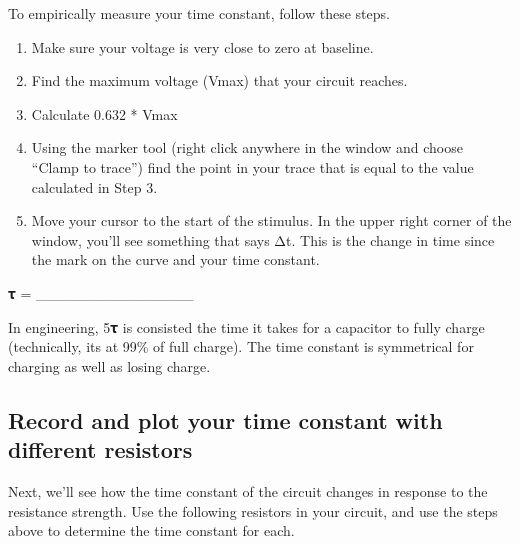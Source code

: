 \documentclass[letterpaper,10pt,english]{jupyterBook}
\begin{document}
\sphinxAtStartPar
To empirically measure your time constant, follow these steps.
\begin{enumerate}
%
\item {} 
\sphinxAtStartPar
Make sure your voltage is very close to zero at baseline.

\item {} 
\sphinxAtStartPar
Find the maximum voltage (Vmax) that your circuit reaches.

\item {} 
\sphinxAtStartPar
Calculate 0.632 * Vmax

\item {} 
\sphinxAtStartPar
Using the marker tool (right click anywhere in the window and choose “Clamp to trace”) find the point in your trace that is equal to the value calculated in Step 3.

\item {} 
\sphinxAtStartPar
Move your cursor to the start of the stimulus. In the upper right corner of the window, you’ll see something that says Δt. This is the change in time since the mark on the curve and your time constant.

\end{enumerate}

\sphinxAtStartPar
{}

\sphinxAtStartPar
𝛕 = \_\_\_\_\_\_\_\_\_\_\_\_\_\_\_

\sphinxAtStartPar
{}

\sphinxAtStartPar
In engineering, 5𝛕 is consisted the time it takes for a capacitor to fully charge (technically, its at 99\% of full charge). The time constant is symmetrical for charging as well as losing charge. 


\subsection{Record and plot your time constant with different resistors}
\label{\detokenize{ModelingNeuralMembranes:record-and-plot-your-time-constant-with-different-resistors}}
\sphinxAtStartPar
Next, we’ll see how the time constant of the circuit changes in response to the resistance strength. Use the following resistors in your circuit, and use the steps above to determine the time constant for each.
\end{document}
